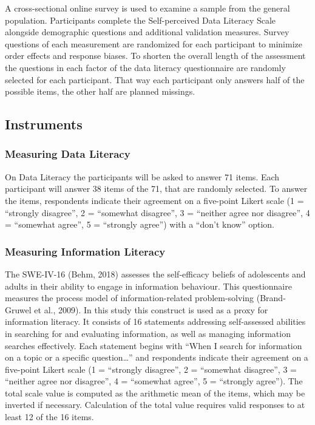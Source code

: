 \documentclass[
  12pt,
  a4paper,
  twoside]{article}
\begin{document}
A cross-sectional online survey is used to examine a sample from the
general population. Participants complete the Self-perceived Data
Literacy Scale alongside demographic questions and additional validation
measures. Survey questions of each measurement are randomized for each
participant to minimize order effects and response biases. To shorten
the overall length of the assessment the questions in each factor of the
data literacy questionnaire are randomly selected for each participant.
That way each participant only answers half of the possible items, the
other half are planned missings.

\subsection{Instruments}\label{instruments}

\subsubsection{Measuring Data Literacy}\label{measuring-data-literacy}

On Data Literacy the participants will be asked to answer 71 items. Each
participant will answer 38 items of the 71, that are randomly selected.
To answer the items, respondents indicate their agreement on a
five-point Likert scale (1 = ``strongly disagree'', 2 = ``somewhat
disagree'', 3 = ``neither agree nor disagree'', 4 = ``somewhat agree'',
5 = ``strongly agree'') with a ``don't know'' option.

\subsubsection{Measuring Information
Literacy}\label{measuring-information-literacy}

The SWE-IV-16 (Behm, 2018) assesses the self-efficacy beliefs of
adolescents and adults in their ability to engage in information
behaviour. This questionnaire measures the process model of
information-related problem-solving (Brand-Gruwel et al., 2009). In this
study this construct is used as a proxy for information literacy. It
consists of 16 statements addressing self-assessed abilities in
searching for and evaluating information, as well as managing
information searches effectively. Each statement begins with ``When I
search for information on a topic or a specific question\ldots{}'' and
respondents indicate their agreement on a five-point Likert scale (1 =
``strongly disagree'', 2 = ``somewhat disagree'', 3 = ``neither agree
nor disagree'', 4 = ``somewhat agree'', 5 = ``strongly agree''). The
total scale value is computed as the arithmetic mean of the items, which
may be inverted if necessary. Calculation of the total value requires
valid responses to at least 12 of the 16 items.
\end{document}
